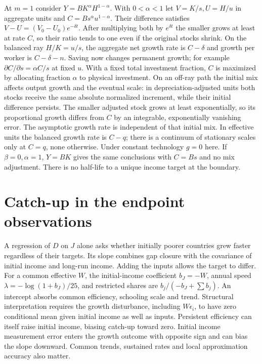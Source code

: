 \documentclass[11pt]{article}
\begin{document}
At $m=1$ consider $Y=BK^\alpha H^{1-\alpha}$. With $0<\alpha<1$ let $V=K/s,U=H/u$ in aggregate units and $C=B s^\alpha u^{1-\alpha}$. Their difference satisfies $V-U=(V_0-U_0)e^{-\delta t}$. After multiplying both by $e^{\delta t}$ the smaller grows at least at rate $C$, so their ratio tends to one even if the original stocks shrink. On the balanced ray $H/K=u/s$, the aggregate net growth rate is $C-\delta$ and growth per worker is $C-\delta-n$. Saving now changes permanent growth; for example $\partial C/\partial s=\alpha C/s$ at fixed $u$. With a fixed total investment fraction, $C$ is maximized by allocating fraction $\alpha$ to physical investment. On an off-ray path the initial mix affects output growth and the eventual scale: in depreciation-adjusted units both stocks receive the same absolute normalized increment, while their initial difference persists. The smaller adjusted stock grows at least exponentially, so its proportional growth differs from $C$ by an integrable, exponentially vanishing error. The asymptotic growth rate is independent of that initial mix. In effective units the balanced growth rate is $C-q$; there is a continuum of stationary scales only at $C=q$, none otherwise. Under constant technology $g=0$ here. If $\beta=0,\alpha=1$, $Y=BK$ gives the same conclusions with $C=Bs$ and no mix adjustment. There is no half-life to a unique income target at the boundary.

\section{Catch-up in the endpoint observations}
A regression of $D$ on $J$ alone asks whether initially poorer countries grew faster regardless of their targets. Its slope combines gap closure with the covariance of initial income and long-run income. Adding the inputs allows the target to differ. For a common effective $W$, the initial-income coefficient $b_J=-W$, annual speed $\lambda=-\log(1+b_J)/25$, and restricted shares are $b_j/(-b_J+\sum b_j)$. An intercept absorbs common efficiency, schooling scale and trend. Structural interpretation requires the growth disturbance, including $W\epsilon_i$, to have zero conditional mean given initial income as well as inputs. Persistent efficiency can itself raise initial income, biasing catch-up toward zero. Initial income measurement error enters the growth outcome with opposite sign and can bias the slope downward. Common trends, sustained rates and local approximation accuracy also matter.
\end{document}

